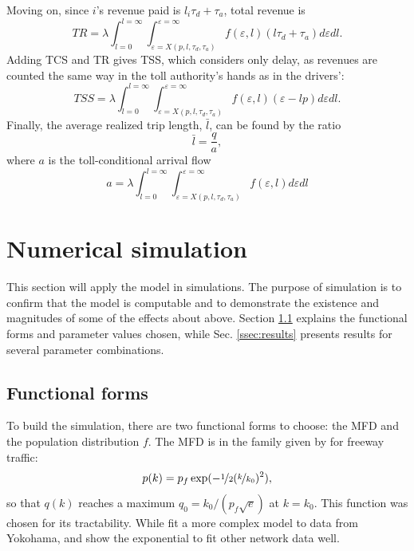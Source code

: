 \documentclass[preprint,authoryear]{elsarticle}
\newcommand{\taud}{\tau_d}
\newcommand{\taua}{\tau_a}
\newcommand{\ve}{\varepsilon}
\begin{document}
Moving on, since $i$'s revenue paid is $l_i \taud + \taua$, total revenue is
\begin{equation}
	TR = \lambda \int_{l=0}^{l=\infty} \int_{\ve=X(p,l,\taud,\taua)}^{\ve=\infty} f(\ve, l)(l\taud + \taua) d\ve dl.
\end{equation}
Adding TCS and TR gives TSS, which considers only delay, as revenues are counted the same way in the toll authority's hands as in the drivers':
\begin{equation}
	TSS = \lambda \int_{l=0}^{l=\infty} \int_{\ve=X(p,l,\taud,\taua)}^{\ve=\infty} f(\ve, l)( \ve - lp) d\ve dl.
\end{equation}
Finally, the average realized trip length, $\bar{l}$, can be found by the ratio
\begin{equation}
	\bar{l} = \frac{q}{a},
\end{equation}
where $a$ is the toll-conditional arrival flow
\begin{equation}
    a = \lambda \int_{l=0}^{l=\infty} \int_{\ve=X(p,l,\taud,\taua)}^{\ve=\infty} f(\ve,l)d\ve dl
\end{equation}

\section{Numerical simulation}
\label{sec:numerical_simulation}

This section will apply the model in simulations. The purpose of simulation is to confirm that the model is computable and to demonstrate the existence and magnitudes of some of the effects about above. Section \ref{ssec:simulation_setup} explains the functional forms and parameter values chosen, while  Sec. \ref{ssec:results} presents results for several parameter combinations.

\subsection{Functional forms}
\label{ssec:simulation_setup}

To build the simulation, there are two functional forms to choose: the MFD and the population distribution $f$. The MFD is in the family given by \citet{Drake1967a} for freeway traffic: 
\begin{equation}
	p(k) = p_f \exp(-\nicefrac{1}{2}(\nicefrac{k}{k_0})^{2}),
\end{equation}
so that $q(k)$ reaches a maximum $q_0=k_0/(p_f\sqrt{e})$ at $k=k_0$. This function was chosen for its tractability. While \citet{Daganzo2012} fit a more complex model to data from Yokohama, \citet{Olszewski1995} and \citet{Williams1987a} show the exponential to fit other network data well.
\end{document}
